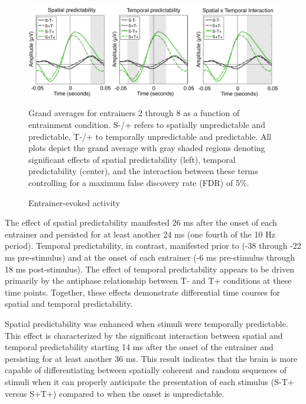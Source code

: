 \documentclass[dwyatte_dissertation.tex]{subfiles}
\begin{document}
\begin{figure}[h!]
\begin{center}
\includegraphics[width=160mm]{figs/chap_pleast/results_entrain_tla_All_montage.pdf}
\end{center}
\caption{Entrainer-evoked activity}{Grand averages for entrainers 2 through 8 as a function of entrainment condition. S-/+ refers to spatially unpredictable and predictable, T-/+ to temporally unpredictable and predictable. All plots depict the grand average with gray shaded regions denoting significant effects of spatial predictability (left), temporal predictability (center), and the interaction between these terms controlling for a maximum false discovery rate (FDR) of 5\%.}
\label{fig:pleast_entrain_tla}
\end{figure}

The effect of spatial predictability manifested 26 ms after the onset of each entrainer and persisted for at least another 24 ms (one fourth of the 10 Hz period). Temporal predictability, in contrast, manifested prior to (-38 through -22 ms pre-stimulus) and at the onset of each entrainer (-6 ms pre-stimulus through 18 ms post-stimulus). The effect of temporal predictability appears to be driven primarily by the antiphase relationship between T- and T+ conditions at these time points. Together, these effects demonstrate differential time courses for spatial and temporal predictability.

Spatial predictability was enhanced when stimuli were temporally predictable. This effect is characterized by the significant interaction between spatial and temporal predictability starting 14 ms after the onset of the entrainer and persisting for at least another 36 ms. This result indicates that the brain is more capable of differentiating between spatially coherent and random sequences of stimuli when it can properly anticipate the presentation of each stimulus (S-T+ versus S+T+) compared to when the onset is unpredictable.
\end{document}
